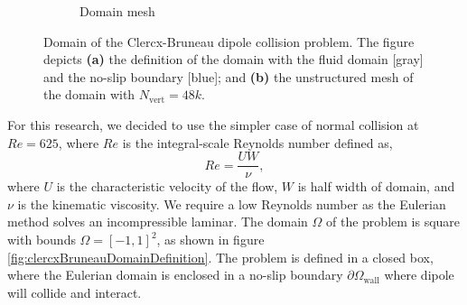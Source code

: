 \begin{figure}[t]
\begin{subfigure}[t]{0.45\textwidth}
             \caption{Domain mesh}
             \label{fig:clercxBruneauDomainMesh}
     \end{subfigure}
     \caption{Domain of the Clercx-Bruneau dipole collision problem. The figure depicts \textbf{(a)} the definition of the domain with the fluid domain [gray] and the no-slip boundary [blue]; and \textbf{(b)} the unstructured mesh of the domain with $N_{\mathrm{vert}} = 48k$.}
     \label{fig:clercxBruneauDomain}
	\end{figure}

For this research, we decided to use the simpler case of normal collision at $Re=625$, where $Re$ is the integral-scale Reynolds number defined as,
	\begin{equation}
	Re = \frac{UW}{\nu},
	\end{equation}
where $U$ is the characteristic velocity of the flow, $W$ is half width of domain, and $\nu$ is the kinematic viscosity. We require a low Reynolds number as the Eulerian method solves an incompressible laminar. The domain $\Omega$ of the problem is square with bounds $\Omega = [-1,1]^2$, as shown in figure \ref{fig:clercxBruneauDomainDefinition}. The problem is defined in a closed box, where the Eulerian domain is enclosed in a no-slip boundary $\partial{\Omega}_{\mathrm{wall}}$ where dipole will collide and interact. 

